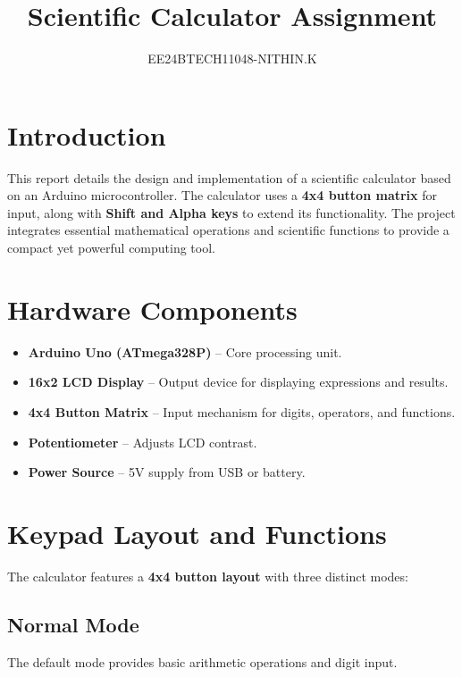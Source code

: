\documentclass[journal]{IEEEtran}
\numberwithin{equation}{enumi}
\numberwithin{figure}{enumi}
\begin{document}


\title{Scientific Calculator Assignment}
\author{EE24BTECH11048-NITHIN.K} 
{\let\newpage\relax\maketitle}
\section*{Introduction}
This report details the design and implementation of a scientific calculator based on an Arduino microcontroller. The calculator uses a \textbf{4x4 button matrix} for input, along with \textbf{Shift and Alpha keys} to extend its functionality. The project integrates essential mathematical operations and scientific functions to provide a compact yet powerful computing tool.

\section*{Hardware Components}
\begin{itemize}
\item \textbf{Arduino Uno (ATmega328P)} -- Core processing unit.
\item \textbf{16x2 LCD Display} -- Output device for displaying expressions and results.
\item \textbf{4x4 Button Matrix} -- Input mechanism for digits, operators, and functions.
\item \textbf{Potentiometer} -- Adjusts LCD contrast.
\item \textbf{Power Source} -- 5V supply from USB or battery.
\end{itemize}

\section*{Keypad Layout and Functions}
The calculator features a \textbf{4x4 button layout} with three distinct modes:

\subsection{Normal Mode}
The default mode provides basic arithmetic operations and digit input.
\end{document}
